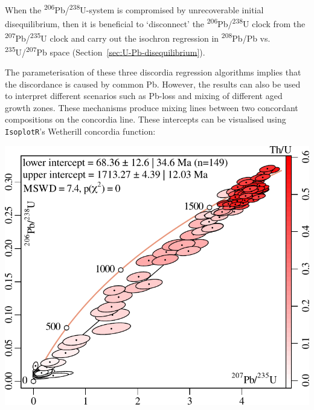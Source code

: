 \begin{refsection}
\begin{enumerate}
  When the \textsuperscript{206}Pb/\textsuperscript{238}U-system is
  compromised by unrecoverable initial disequilibrium, then it is
  beneficial to `disconnect' the
  \textsuperscript{206}Pb/\textsuperscript{238}U clock from the
  \textsuperscript{207}Pb/\textsuperscript{235}U clock and carry out
  the isochron regression in
  \textsuperscript{208}Pb/Pb
  vs. \textsuperscript{235}U/\textsuperscript{207}Pb space
  (Section~\ref{sec:U-Pb-disequilibrium}).
    
\end{enumerate}

The parameterisation of these three discordia regression algorithms
implies that the discordance is caused by common Pb. However, the
results can also be used to interpret different scenarios such as
Pb-loss and mixing of different aged growth zones. These mechanisms
produce mixing lines between two concordant compositions on the
concordia line. These intercepts can be visualised using
\texttt{IsoplotR}'s Wetherill concordia function:

\noindent\begin{minipage}[t]{.5\linewidth}
\strut\newline
\includegraphics[width=\textwidth]{../figures/Hourigan.pdf}
\end{minipage}
\noindent\begin{minipage}[t]{.5\linewidth}
\label{fig:Hourigan}
\end{minipage}


\end{refsection}

